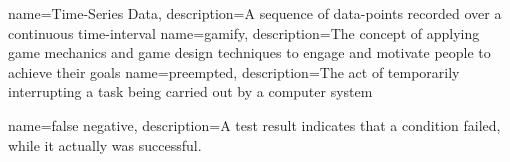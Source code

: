  {
  name=Time-Series Data, description={A sequence of data-points recorded over a
  continuous time-interval}
}
 {
  name=gamify, description={The concept of applying game mechanics and game
  design techniques to engage and motivate people to achieve their goals}
}
 {
  name=preempted, description={The act of temporarily interrupting a task being
  carried out by a computer system}
}

 { name=false negative, description={A test
result indicates that a condition failed, while it actually was successful.} }
